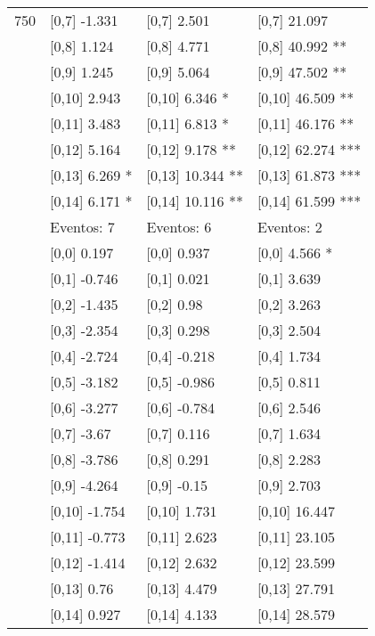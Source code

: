 \begin{table}
\begin{tabular}[t]{llll}
750 & {}[0,7] -1.331 & {}[0,7] 2.501 & {}[0,7] 21.097\\
\addlinespace
 & {}[0,8] 1.124 & {}[0,8] 4.771 & {}[0,8] 40.992 **\\
 & {}[0,9] 1.245 & {}[0,9] 5.064 & {}[0,9] 47.502 **\\
 & {}[0,10] 2.943 & {}[0,10] 6.346 * & {}[0,10] 46.509 **\\
 & {}[0,11] 3.483 & {}[0,11] 6.813 * & {}[0,11] 46.176 **\\
 & {}[0,12] 5.164 & {}[0,12] 9.178 ** & {}[0,12] 62.274 ***\\
\addlinespace
 & {}[0,13] 6.269 * & {}[0,13] 10.344 ** & {}[0,13] 61.873 ***\\
 & {}[0,14] 6.171 * & {}[0,14] 10.116 ** & {}[0,14] 61.599 ***\\
 & Eventos:  7 & Eventos:  6 & Eventos:  2\\
 & {}[0,0] 0.197 & {}[0,0] 0.937 & {}[0,0] 4.566 *\\
 & {}[0,1] -0.746 & {}[0,1] 0.021 & {}[0,1] 3.639\\
\addlinespace
 & {}[0,2] -1.435 & {}[0,2] 0.98 & {}[0,2] 3.263\\
 & {}[0,3] -2.354 & {}[0,3] 0.298 & {}[0,3] 2.504\\
 & {}[0,4] -2.724 & {}[0,4] -0.218 & {}[0,4] 1.734\\
 & {}[0,5] -3.182 & {}[0,5] -0.986 & {}[0,5] 0.811\\
 & {}[0,6] -3.277 & {}[0,6] -0.784 & {}[0,6] 2.546\\
\addlinespace
1000 & {}[0,7] -3.67 & {}[0,7] 0.116 & {}[0,7] 1.634\\
 & {}[0,8] -3.786 & {}[0,8] 0.291 & {}[0,8] 2.283\\
 & {}[0,9] -4.264 & {}[0,9] -0.15 & {}[0,9] 2.703\\
 & {}[0,10] -1.754 & {}[0,10] 1.731 & {}[0,10] 16.447\\
 & {}[0,11] -0.773 & {}[0,11] 2.623 & {}[0,11] 23.105\\
\addlinespace
 & {}[0,12] -1.414 & {}[0,12] 2.632 & {}[0,12] 23.599\\
 & {}[0,13] 0.76 & {}[0,13] 4.479 & {}[0,13] 27.791\\
 & {}[0,14] 0.927 & {}[0,14] 4.133 & {}[0,14] 28.579\\
\bottomrule
\end{tabular}
\end{table}
